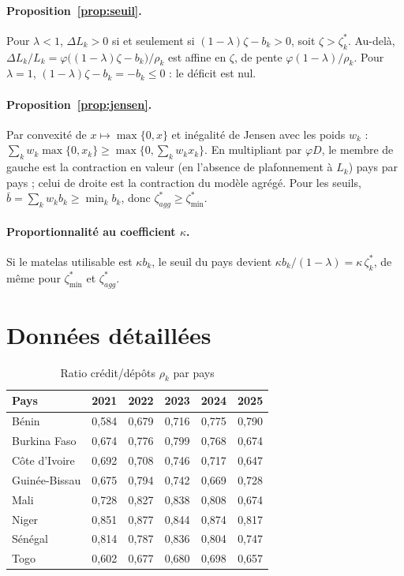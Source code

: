 \documentclass[11pt,a4paper]{article}
\newcommand{\zs}{\zeta^{*}}
\begin{document}
	\paragraph{Proposition~\ref{prop:seuil}.} Pour $\lambda<1$, $\Delta L_k>0$ si et seulement si $(1-\lambda)\zeta-b_k>0$, soit $\zeta>\zs_k$. Au-delà, $\Delta L_k/L_k=\varphi\big((1-\lambda)\zeta-b_k\big)/\rho_k$ est affine en $\zeta$, de pente $\varphi(1-\lambda)/\rho_k$. Pour $\lambda=1$, $(1-\lambda)\zeta-b_k=-b_k\le0$ : le déficit est nul.
	
	\paragraph{Proposition~\ref{prop:jensen}.} Par convexité de $x\mapsto\max\{0,x\}$ et inégalité de Jensen avec les poids $w_k$ : $\sum_k w_k\max\{0,x_k\}\ge\max\{0,\sum_k w_k x_k\}$. En multipliant par $\varphi D$, le membre de gauche est la contraction en valeur (en l'absence de plafonnement à $L_k$) pays par pays ; celui de droite est la contraction du modèle agrégé. Pour les seuils, $\bar b=\sum_k w_k b_k\ge\min_k b_k$, donc $\zs_{agg}\ge\zs_{\min}$.
	
	\paragraph{Proportionnalité au coefficient $\kappa$.} Si le matelas utilisable est $\kappa b_k$, le seuil du pays devient $\kappa b_k/(1-\lambda)=\kappa\,\zs_k$, de même pour $\zs_{\min}$ et $\zs_{agg}$.
	
	\section{Données détaillées}\label{app:donnees}
	
	\begin{table}[htbp]
		\centering
		\caption{Ratio crédit/dépôts $\rho_k$ par pays}\label{tab:rho}
		\small
		\begin{tabular}{lccccc}
			\toprule
			Pays & 2021 & 2022 & 2023 & 2024 & 2025 \\
			\midrule
			Bénin & 0,584 & 0,679 & 0,716 & 0,775 & 0,790 \\
			Burkina Faso & 0,674 & 0,776 & 0,799 & 0,768 & 0,674 \\
			Côte d'Ivoire & 0,692 & 0,708 & 0,746 & 0,717 & 0,647 \\
			Guinée-Bissau & 0,675 & 0,794 & 0,742 & 0,669 & 0,728 \\
			Mali & 0,728 & 0,827 & 0,838 & 0,808 & 0,674 \\
			Niger & 0,851 & 0,877 & 0,844 & 0,874 & 0,817 \\
			Sénégal & 0,814 & 0,787 & 0,836 & 0,804 & 0,747 \\
			Togo & 0,602 & 0,677 & 0,680 & 0,698 & 0,657 \\
			\bottomrule
		\end{tabular}
	\end{table}
	
\end{document}
